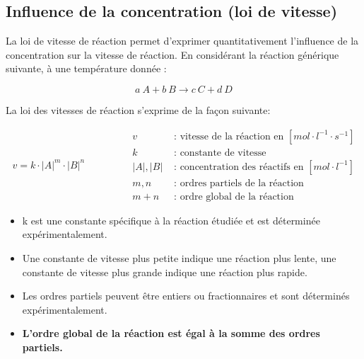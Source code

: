 \documentclass[
  11pt,
  a4paper,
  openany]{book}
\providecommand{\tightlist}{%
  \setlength{\itemsep}{0pt}\setlength{\parskip}{0pt}}
\begin{document}
\subsection{Influence de la concentration (loi de vitesse)}\label{influence-de-la-concentration-loi-de-vitesse}

La loi de vitesse de réaction permet d'exprimer quantitativement l'influence de la concentration sur la vitesse de réaction. En considérant la réaction générique suivante, à une température donnée :

\[
a\ A + b\ B \rightarrow c\ C + d\ D
\]

La loi des vitesses de réaction s'exprime de la façon suivante:

\[
\begin{split}
v = k \cdot |A|^m \cdot |B|^n
\end{split}
\qquad\qquad
\begin{split}
v &\text{ : vitesse de la réaction en } [mol \cdot l^{-1} \cdot s^{-1}] \\
k &\text{ : constante de vitesse} \\
|A|, |B| &\text{ : concentration des réactifs en } [mol \cdot l^{-1}] \\
m, n &\text{ : ordres partiels de la réaction} \\
m+n &\text{ : ordre global de la réaction}
\end{split}
\]

\begin{itemize}
\tightlist
\item
  k est une constante spécifique à la réaction étudiée et est déterminée expérimentalement.
\item
  Une constante de vitesse plus petite indique une réaction plus lente, une constante de vitesse plus grande indique une réaction plus rapide.
\item
  Les ordres partiels peuvent être entiers ou fractionnaires et sont déterminés expérimentalement.
\item
  \textbf{L'ordre global de la réaction est égal à la somme des ordres partiels.}
\end{itemize}
\end{document}
